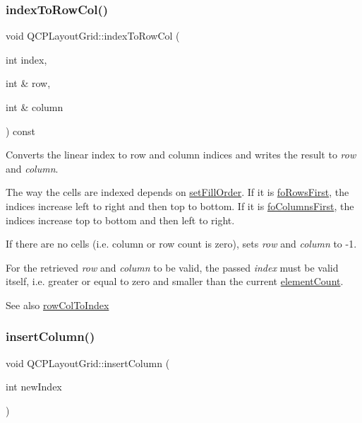 \subsubsection{\texorpdfstring{indexToRowCol()}{indexToRowCol()}}
{\footnotesize\ttfamily void Q\+C\+P\+Layout\+Grid\+::index\+To\+Row\+Col (\begin{DoxyParamCaption}\item[{int}]{index,  }\item[{int \&}]{row,  }\item[{int \&}]{column }\end{DoxyParamCaption}) const}

Converts the linear index to row and column indices and writes the result to {\itshape row} and {\itshape column}.

The way the cells are indexed depends on \mbox{\hyperlink{class_q_c_p_layout_grid_affc2f3cfd22f28698c5b29b960d2a391}{set\+Fill\+Order}}. If it is \mbox{\hyperlink{class_q_c_p_layout_grid_a7d49ee08773de6b2fd246edfed353ccaa0202730954e26c474cc820164aedce3e}{fo\+Rows\+First}}, the indices increase left to right and then top to bottom. If it is \mbox{\hyperlink{class_q_c_p_layout_grid_a7d49ee08773de6b2fd246edfed353ccaac4cb4b796ec4822d5894b47b51627fb3}{fo\+Columns\+First}}, the indices increase top to bottom and then left to right.

If there are no cells (i.\+e. column or row count is zero), sets {\itshape row} and {\itshape column} to -\/1.

For the retrieved {\itshape row} and {\itshape column} to be valid, the passed {\itshape index} must be valid itself, i.\+e. greater or equal to zero and smaller than the current \mbox{\hyperlink{class_q_c_p_layout_grid_a9a8942aface780a02445ebcf14c48513}{element\+Count}}.

\begin{DoxySeeAlso}{See also}
\mbox{\hyperlink{class_q_c_p_layout_grid_a682ba76f130810ffd294032a1bfbcfcb}{row\+Col\+To\+Index}} 
\end{DoxySeeAlso}
\mbox{\label{class_q_c_p_layout_grid_a1e880a321dbe8b43b471ccd764433dc4}} 
\subsubsection{\texorpdfstring{insertColumn()}{insertColumn()}}
{\footnotesize\ttfamily void Q\+C\+P\+Layout\+Grid\+::insert\+Column (\begin{DoxyParamCaption}\item[{int}]{new\+Index }\end{DoxyParamCaption})}

